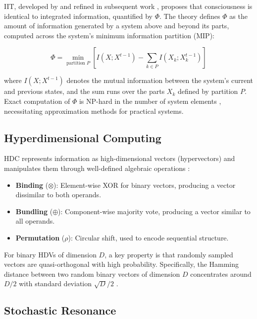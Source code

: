 \documentclass[12pt,a4paper]{article}
\begin{document}
IIT, developed by \citet{tononi2004information} and refined in subsequent work \citep{tononi2008consciousness, oizumi2014phenomenology}, proposes that consciousness is identical to integrated information, quantified by $\Phi$. The theory defines $\Phi$ as the amount of information generated by a system above and beyond its parts, computed across the system's minimum information partition (MIP):

\begin{equation}
\Phi = \min_{\text{partition } P} \left[ I(X; X^{t-1}) - \sum_{k \in P} I(X_k; X_k^{t-1}) \right]
\label{eq:phi}
\end{equation}

where $I(X; X^{t-1})$ denotes the mutual information between the system's current and previous states, and the sum runs over the parts $X_k$ defined by partition $P$. Exact computation of $\Phi$ is NP-hard in the number of system elements \citep{tegmark2016improved}, necessitating approximation methods for practical systems.

\subsection{Hyperdimensional Computing}

HDC represents information as high-dimensional vectors (hypervectors) and manipulates them through well-defined algebraic operations \citep{kanerva2009hyperdimensional}:

\begin{itemize}
    \item \textbf{Binding} ($\otimes$): Element-wise XOR for binary vectors, producing a vector dissimilar to both operands.
    \item \textbf{Bundling} ($\oplus$): Component-wise majority vote, producing a vector similar to all operands.
    \item \textbf{Permutation} ($\rho$): Circular shift, used to encode sequential structure.
\end{itemize}

For binary HDVs of dimension $D$, a key property is that randomly sampled vectors are quasi-orthogonal with high probability. Specifically, the Hamming distance between two random binary vectors of dimension $D$ concentrates around $D/2$ with standard deviation $\sqrt{D}/2$ \citep{kanerva2009hyperdimensional}.

\subsection{Stochastic Resonance}
\end{document}
